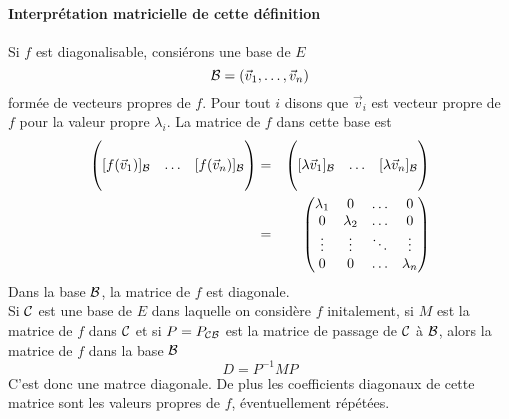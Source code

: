 \paragraph{Interprétation matricielle de cette définition} Si $f$ est diagonalisable, consiérons une base de $E$ 
$$\mathcal{B} = (\vec{v}_1, \ldots, \vec{v}_n)$$
formée de vecteurs propres de $f$.  Pour tout $i$ disons que $\vec{v}_i$ est vecteur propre de $f$ pour la valeur propre $\lambda_i$. La matrice de $f$ dans cette base est
\begin{eqnarray*}
  \begin{pmatrix} \\ [f(\vec{v}_1)]_{\mathcal{B}} & \ldots & [f(\vec{v}_n)]_{\mathcal{B}} \\ \\ \end{pmatrix} &=& 
    \begin{pmatrix} \\ [\lambda \vec{v}_1]_{\mathcal{B}} & \ldots & [\lambda \vec{v}_n]_{\mathcal{B}} \\ \\ \end{pmatrix} \\
    &=& \begin{pmatrix} 
      \lambda_1 & 0 & \ldots & 0 \\
      0 & \lambda_2 & \ldots & 0 \\
      \vdots & \vdots & \ddots & \vdots \\
      0 & 0 & \ldots & \lambda_n \\
    \end{pmatrix}
\end{eqnarray*}
Dans la base $\mathcal{B}$, la matrice de $f$ est diagonale. \\
Si $\mathcal{C}$ est une base de $E$ dans laquelle on considère $f$ initalement, si $M$ est la matrice de $f$ dans $\mathcal{C}$ et si $P = P_{\mathcal{C} \mathcal{B}}$ est la matrice de passage de $\mathcal{C}$ à $\mathcal{B}$, alors la matrice de $f$ dans la base $\mathcal{B}$ 
$$D = P^{-1} M P$$
C'est donc une  matrce diagonale. De plus les coefficients diagonaux de cette matrice sont les valeurs propres de $f$, éventuellement répétées.


